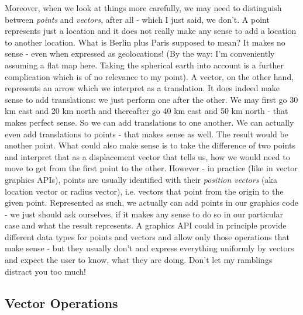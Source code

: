 \medskip
Moreover, when we look at things more carefully, we may need to distinguish between \emph{points} and \emph{vectors}, after all - which I just said, we don't. A point represents just a location and it does not really make any sense to add a location to another location. What is Berlin plus Paris supposed to mean? It makes no sense - even when expressed as geolocations! (By the way: I'm conveniently assuming a flat map here. Taking the spherical earth into account is a further complication which is of no relevance to my point). A vector, on the other hand, represents an arrow which we interpret as a translation. It does indeed make sense to add translations: we just perform one after the other. We may first go 30 km east and 20 km north and thereafter go 40 km east and 50 km north - that makes perfect sense. So we can add translations to one another. We can actually even add translations to points - that makes sense as well. The result would be another point. What could also make sense is to take the difference of two points and interpret that as a displacement vector that tells us, how we would need to move to get from the first point to the other. However - in practice (like in vector graphics APIs), points are usually identified with their \emph{position vectors} (aka location vector or radius vector), i.e. vectors that point from the origin to the given point. Represented as such, we actually can add points in our graphics code - we just should ask ourselves, if it makes any sense to do so in our particular case and what the result represents. A graphics API could in principle provide different data types for points and vectors and allow only those operations that make sense - but they usually don't and express everything uniformly by vectors and expect the user to know, what they are doing. Don't let my ramblings distract you too much!


\subsection{Vector Operations}

